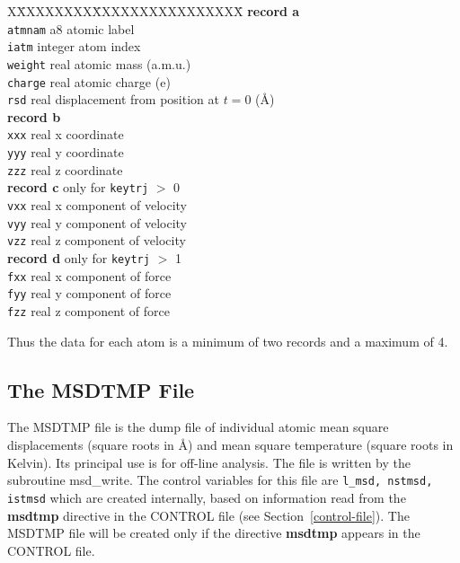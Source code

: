 \begin{tabbing}
X\=XXXXXXXX\=XXXXXXXXXXXXXXXX\=\kill
{\bf record a} \\
\> {\tt atmnam} \> a8      \> atomic label \\
\> {\tt iatm}   \> integer \> atom index \\
\> {\tt weight} \> real    \> atomic mass (a.m.u.) \\
\> {\tt charge} \> real    \> atomic charge (e) \\
\> {\tt rsd}    \> real    \> displacement from position at $t=0$ (\AA)\\
{\bf record b} \\
\> {\tt xxx}    \> real    \> x coordinate \\
\> {\tt yyy}    \> real    \> y coordinate \\
\> {\tt zzz}    \> real    \> z coordinate \\
{\bf record c} only for {\tt keytrj} $>$ 0 \\
\> {\tt vxx}    \> real    \> x component of velocity \\
\> {\tt vyy}    \> real    \> y component of velocity \\
\> {\tt vzz}    \> real    \> z component of velocity \\
{\bf record d} only for {\tt keytrj} $>$ 1 \\
\> {\tt fxx}    \> real    \> x component of force \\
\> {\tt fyy}    \> real    \> y component of force \\
\> {\tt fzz}    \> real    \> z component of force
\end{tabbing}
Thus the data for each atom is a minimum of two records and a maximum
of 4.

\subsection{The MSDTMP File}
\label{msdtmp-file}

The MSDTMP file is the dump file of individual atomic mean square
displacements (square roots in \AA) and mean square temperature
(square roots in Kelvin).  Its principal use is for off-line analysis.
The file is written by the subroutine {\sc msd\_write}.  The control
variables for this file are {\tt l\_msd, nstmsd, istmsd} which are
created internally, based on information read from the {\bf msdtmp}
directive in the CONTROL file (see Section~\ref{control-file}).
The MSDTMP file will be created only if the directive {\bf msdtmp}
appears in the CONTROL file.

